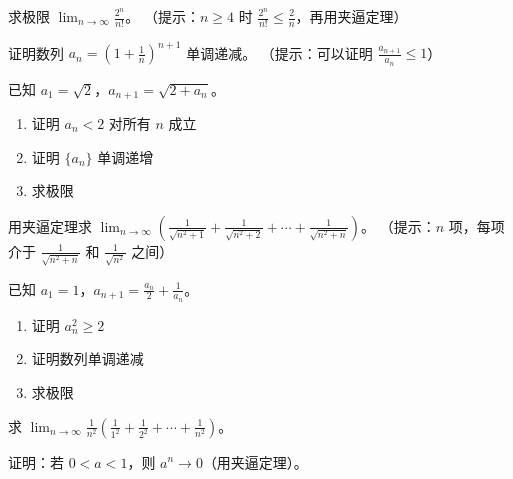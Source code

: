 \begin{exercise}[3]
求极限 \(\displaystyle \lim_{n\to\infty} \frac{2^n}{n!}\)。
（提示：\(n \ge 4\) 时 \(\frac{2^n}{n!} \le \frac{2}{n}\)，再用夹逼定理）
\end{exercise}

\begin{exercise}[3]
证明数列 \(a_n = \left(1 + \frac{1}{n}\right)^{n+1}\) 单调递减。
（提示：可以证明 \(\frac{a_{n+1}}{a_n} \le 1\)）
\end{exercise}


\begin{exercise}[4]
已知 \(a_1 = \sqrt{2}\)，\(a_{n+1} = \sqrt{2 + a_n}\)。
\begin{enumerate}
  \item[(1)] 证明 \(a_n < 2\) 对所有 \(n\) 成立
  \item[(2)] 证明 \(\{a_n\}\) 单调递增
  \item[(3)] 求极限
\end{enumerate}
\end{exercise}

\begin{exercise}[4]
用夹逼定理求 \(\displaystyle \lim_{n\to\infty} \left(\frac{1}{\sqrt{n^2+1}} + \frac{1}{\sqrt{n^2+2}} + \cdots + \frac{1}{\sqrt{n^2+n}}\right)\)。
（提示：\(n\) 项，每项介于 \(\frac{1}{\sqrt{n^2+n}}\) 和 \(\frac{1}{\sqrt{n^2}}\) 之间）
\end{exercise}

\begin{exercise}[4]
已知 \(a_1 = 1\)，\(a_{n+1} = \frac{a_n}{2} + \frac{1}{a_n}\)。
\begin{enumerate}
  \item[(1)] 证明 \(a_n^2 \ge 2\)
  \item[(2)] 证明数列单调递减
  \item[(3)] 求极限
\end{enumerate}
\end{exercise}

\begin{exercise}[4]
求 \(\displaystyle \lim_{n\to\infty} \frac{1}{n^2} \left( \frac{1}{1^2} + \frac{1}{2^2} + \cdots + \frac{1}{n^2} \right)\)。
\end{exercise}

\begin{exercise}[4]
证明：若 \(0 < a < 1\)，则 \(a^n \to 0\)（用夹逼定理）。
\end{exercise}


